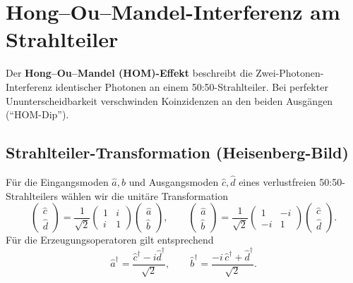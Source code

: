 \section{Hong--Ou--Mandel-Interferenz am \newline Strahlteiler}
\label{anhangA:HOM}

Der \textbf{Hong--Ou--Mandel (HOM)-Effekt} beschreibt die Zwei-Pho\-tonen-Interferenz identischer Photonen an einem 50:50-Strahlteiler.
Bei perfekter Ununterscheidbarkeit verschwinden Koinzidenzen an den beiden Ausgängen (``HOM-Dip'').

\subsection*{Strahlteiler-Transformation (Heisenberg-Bild)}
Für die Eingangsmoden \(\hat a,\hat b\) und Ausgangsmoden \(\hat c,\hat d\) eines verlustfreien 50:50-Strahlteilers wählen wir die unitäre Transformation
\[
\begin{pmatrix}
	\hat c \\ \hat d
\end{pmatrix}
= \frac{1}{\sqrt{2}}
\begin{pmatrix}
	1 & i \\
	i & 1
\end{pmatrix}
\begin{pmatrix}
	\hat a \\ \hat b
\end{pmatrix},
\qquad
\begin{pmatrix}
	\hat a \\ \hat b
\end{pmatrix}
= \frac{1}{\sqrt{2}}
\begin{pmatrix}
	1 & -i \\
	-i & 1
\end{pmatrix}
\begin{pmatrix}
	\hat c \\ \hat d
\end{pmatrix}.
\]
Für die Erzeugungsoperatoren gilt entsprechend
\[
\hat a^\dagger=\frac{\hat c^\dagger - i \hat d^\dagger}{\sqrt{2}},
\qquad
\hat b^\dagger=\frac{-i\,\hat c^\dagger + \hat d^\dagger}{\sqrt{2}}.
\]

